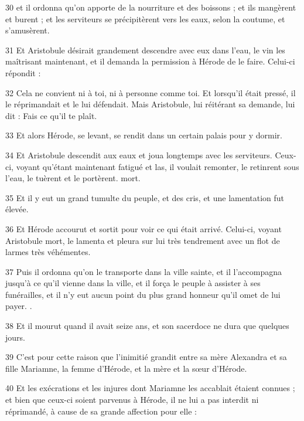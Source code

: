 \par 30 et il ordonna qu'on apporte de la nourriture et des boissons ; et ils mangèrent et burent ; et les serviteurs se précipitèrent vers les eaux, selon la coutume, et s'amusèrent.

\par 31 Et Aristobule désirait grandement descendre avec eux dans l'eau, le vin les maîtrisant maintenant, et il demanda la permission à Hérode de le faire. Celui-ci répondit :

\par 32 Cela ne convient ni à toi, ni à personne comme toi. Et lorsqu'il était pressé, il le réprimandait et le lui défendait. Mais Aristobule, lui réitérant sa demande, lui dit : Fais ce qu'il te plaît.

\par 33 Et alors Hérode, se levant, se rendit dans un certain palais pour y dormir.

\par 34 Et Aristobule descendit aux eaux et joua longtemps avec les serviteurs. Ceux-ci, voyant qu'étant maintenant fatigué et las, il voulait remonter, le retinrent sous l'eau, le tuèrent et le portèrent. mort.

\par 35 Et il y eut un grand tumulte du peuple, et des cris, et une lamentation fut élevée.

\par 36 Et Hérode accourut et sortit pour voir ce qui était arrivé. Celui-ci, voyant Aristobule mort, le lamenta et pleura sur lui très tendrement avec un flot de larmes très véhémentes.

\par 37 Puis il ordonna qu'on le transporte dans la ville sainte, et il l'accompagna jusqu'à ce qu'il vienne dans la ville, et il força le peuple à assister à ses funérailles, et il n'y eut aucun point du plus grand honneur qu'il omet de lui payer. .

\par 38 Et il mourut quand il avait seize ans, et son sacerdoce ne dura que quelques jours.

\par 39 C'est pour cette raison que l'inimitié grandit entre sa mère Alexandra et sa fille Mariamne, la femme d'Hérode, et la mère et la sœur d'Hérode.

\par 40 Et les exécrations et les injures dont Mariamne les accablait étaient connues ; et bien que ceux-ci soient parvenus à Hérode, il ne lui a pas interdit ni réprimandé, à cause de sa grande affection pour elle :

